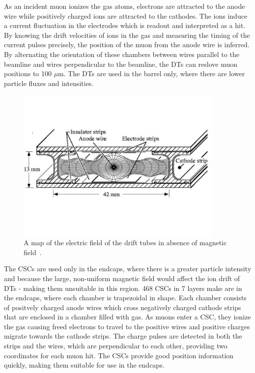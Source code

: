 As an incident muon ionizes the gas atoms, electrons are attracted to the anode wire while positively charged ions are attracted to the cathodes. 
The ions induce a current fluctuation in the electrodes which is readout and interpreted as a hit. By knowing the drift velocities of ions in the gas and measuring
the timing of the current pulses precisely, the position of the muon from the anode wire is inferred. By alternating the orientation of these chambers between wires parallel to the beamline
and wires perpendicular to the beamline, the DTs can reslove muon positions to 100 $\mu$m. 
The DTs are used in the barrel only, where there are lower particle fluxes and intensities. 

\begin{figure}[hbtp]
 \begin{center}
   \includegraphics[width=0.9\textwidth]{ch3_figs/cms_dt.pdf}
   \caption[Drift tube chamber and internal E field]{A map of the electric field of the drift tubes in absence of magnetic field~\cite{cms_bluebook}.}
   \label{fig:cms_dt}
 \end{center}
\end{figure}

The CSCs are used only in the endcaps, where there is a greater particle intensity and because the large, non-uniform magnetic field would affect the ion drift of DTs - making them unsuitable in this region.
468 CSCs in 7 layers make are in the endcaps, where each chamber is trapezoidal in shape.
Each chamber consists of positvely charged anode wires which cross negatively charged cathode strips that are enclosed in a chamber filled with gas. As muons enter a
CSC, they ionize the gas causing freed electrons to travel to the positive wires and positive charges migrate towards the cathode strips. The charge pulses are detected in both the strips
and the wires, which are perpendicular to each other, providing two coordinates for each muon hit. The CSCs provide good position information quickly, making them suitable for use in the endcaps. 

